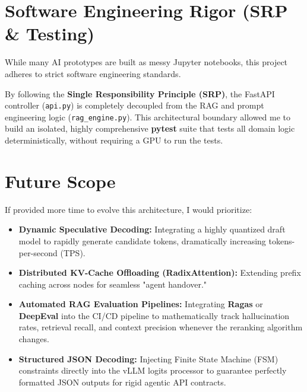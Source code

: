 \documentclass[11pt, letterpaper]{article}
\begin{document}
\section{Software Engineering Rigor (SRP \& Testing)}
While many AI prototypes are built as messy Jupyter notebooks, this project adheres to strict software engineering standards. 

By following the \textbf{Single Responsibility Principle (SRP)}, the FastAPI controller (\texttt{api.py}) is completely decoupled from the RAG and prompt engineering logic (\texttt{rag\_engine.py}). This architectural boundary allowed me to build an isolated, highly comprehensive \textbf{pytest} suite that tests all domain logic deterministically, without requiring a GPU to run the tests.

\section{Future Scope}
If provided more time to evolve this architecture, I would prioritize:
\begin{itemize}
    \item \textbf{Dynamic Speculative Decoding:} Integrating a highly quantized draft model to rapidly generate candidate tokens, dramatically increasing tokens-per-second (TPS).
    \item \textbf{Distributed KV-Cache Offloading (RadixAttention):} Extending prefix caching across nodes for seamless "agent handover."
    \item \textbf{Automated RAG Evaluation Pipelines:} Integrating \textbf{Ragas} or \textbf{DeepEval} into the CI/CD pipeline to mathematically track hallucination rates, retrieval recall, and context precision whenever the reranking algorithm changes.
    \item \textbf{Structured JSON Decoding:} Injecting Finite State Machine (FSM) constraints directly into the vLLM logits processor to guarantee perfectly formatted JSON outputs for rigid agentic API contracts.
\end{itemize}
\end{document}
